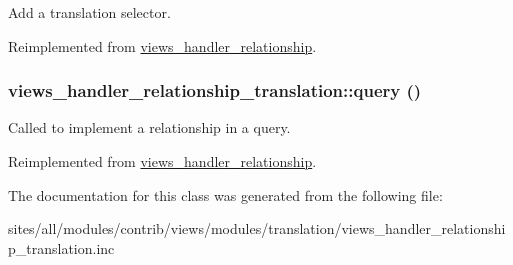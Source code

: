 Add a translation selector. 

Reimplemented from \hyperlink{classviews__handler__relationship_08cc3f5947964d936b5e88d198f82c30}{views\_\-handler\_\-relationship}.\hypertarget{classviews__handler__relationship__translation_f1e8ba159a9b04199ff03cad304ca1e4}{
\subsubsection[{query}]{\setlength{\rightskip}{0pt plus 5cm}views\_\-handler\_\-relationship\_\-translation::query ()}}
\label{classviews__handler__relationship__translation_f1e8ba159a9b04199ff03cad304ca1e4}


Called to implement a relationship in a query. 

Reimplemented from \hyperlink{classviews__handler__relationship_7dc0b6371807dbf06efa594cb52b3348}{views\_\-handler\_\-relationship}.

The documentation for this class was generated from the following file:\begin{CompactItemize}
\item 
sites/all/modules/contrib/views/modules/translation/views\_\-handler\_\-relationship\_\-translation.inc\end{CompactItemize}
